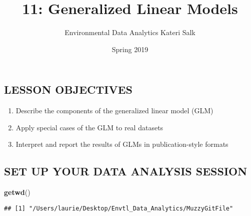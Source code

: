 \documentclass[]{article}
\title{11: Generalized Linear Models}
\author{Environmental Data Analytics \textbar{} Kateri Salk}
\date{Spring 2019}
\newenvironment{Shaded}{\begin{snugshade}}{\end{snugshade}}
\newcommand{\KeywordTok}[1]{\textcolor[rgb]{0.13,0.29,0.53}{\textbf{#1}}}
\newcommand{\NormalTok}[1]{#1}
\providecommand{\tightlist}{%
  \setlength{\itemsep}{0pt}\setlength{\parskip}{0pt}}
\begin{document}
\maketitle

\subsection{LESSON OBJECTIVES}\label{lesson-objectives}

\begin{enumerate}
\def\labelenumi{\arabic{enumi}.}
\tightlist
\item
  Describe the components of the generalized linear model (GLM)
\item
  Apply special cases of the GLM to real datasets
\item
  Interpret and report the results of GLMs in publication-style formats
\end{enumerate}

\subsection{SET UP YOUR DATA ANALYSIS
SESSION}\label{set-up-your-data-analysis-session}

\begin{Shaded}
\begin{Highlighting}[]
\KeywordTok{getwd}\NormalTok{()}
\end{Highlighting}
\end{Shaded}

\begin{verbatim}
## [1] "/Users/laurie/Desktop/Envtl_Data_Analytics/MuzzyGitFile"
\end{verbatim}
\end{document}
